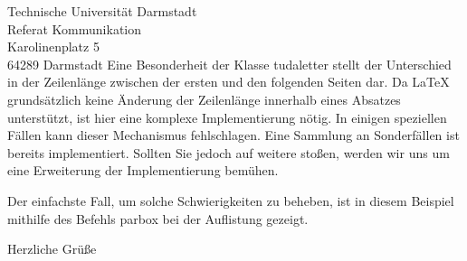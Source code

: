 \documentclass[
	ngerman,
	accentcolor=9c,%
	premium=true,%
]{tudaletter}
\begin{document}
\begin{letter}{%
    Technische Universität Darmstadt\\%
    Referat Kommunikation\\%
    Karolinenplatz 5\\%
    64289 Darmstadt}
Eine Besonderheit der Klasse tudaletter stellt der Unterschied in der Zeilenlänge zwischen der ersten und den folgenden Seiten dar. Da \LaTeX{} grundsätzlich keine Änderung der Zeilenlänge innerhalb eines Absatzes unterstützt, ist hier eine komplexe Implementierung nötig. In einigen speziellen Fällen kann dieser Mechanismus fehlschlagen. Eine Sammlung an Sonderfällen ist bereits implementiert. Sollten Sie jedoch auf weitere stoßen, werden wir uns um eine Erweiterung der Implementierung bemühen.

Der einfachste Fall, um solche Schwierigkeiten zu beheben, ist in diesem Beispiel mithilfe des Befehls parbox bei der Auflistung gezeigt.

\closing{Herzliche Grüße}


\end{letter}
\end{document}
